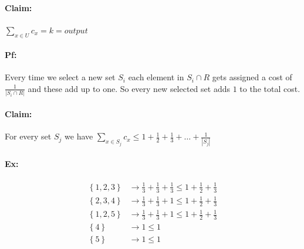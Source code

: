 \documentclass[12 pt]{article}
\begin{document}
          \paragraph{Claim:} $\displaystyle \sum_{x \in U}c_x =
          k=output$
          \paragraph{Pf:} Every time we select a new set $S_i$ each
          element in $S_i\cap R$ gets assigned a cost of
          $\frac{1}{\left|S_i \cap R\right|}$ and these add up to
          one. So every new selected set adds $1$ to the total cost.
          \paragraph{Claim:} For every set $S_j$ we have $\sum_{x \in
            S_j}c_x \leq
          1+\frac{1}{2}+\frac{1}{3}+\ldots+\frac{1}{\left|S_j\right|}$
          \paragraph{Ex:}
          \begin{align*}
            \left\{1,2,3\right\} & \to \frac{1}{3}+\frac{1}{3}+\frac{1}{3} \leq 1+\frac{1}{2}+\frac{1}{3}
            \\ \left\{2,3,4\right\} & \to \frac{1}{3}+\frac{1}{3}+1 \leq 1+\frac{1}{2}+\frac{1}{3}
            \\ \left\{1,2,5\right\} & \to \frac{1}{3}+\frac{1}{3}+1 \leq 1 + \frac{1}{2} + \frac{1}{3}
            \\ \left\{4\right\} & \to 1 \leq 1
            \\ \left\{5\right\} & \to 1 \leq 1
          \end{align*}
\end{document}
